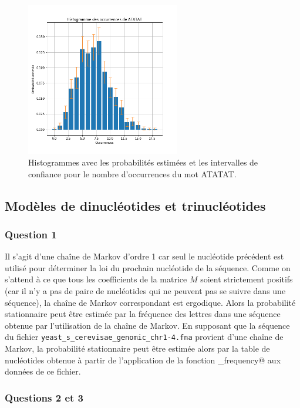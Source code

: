 \documentclass[a4paper,12pt]{article}
\begin{document}
\begin{figure}
\centering
\includegraphics[width=0.6\textwidth]{Figures/histogramme_ATATAT_errorbar.png}
\caption{Histogrammes avec les probabilités estimées et les intervalles de confiance pour le nombre d'occurrences du mot ATATAT.}
\label{FigHistogrammeErrorBar}
\end{figure}

\subsection{Modèles de dinucléotides et trinucléotides}

\subsubsection*{Question 1}

Il s'agit d'une chaîne de Markov d'ordre 1 car seul le nucléotide précédent est utilisé pour déterminer la loi du prochain nucléotide de la séquence. Comme on s'attend à ce que tous les coefficients de la matrice $M$ soient strictement positifs (car il n'y a pas de paire de nucléotides qui ne peuvent pas se suivre dans une séquence), la chaîne de Markov correspondant est ergodique. Alors la probabilité stationnaire peut être estimée par la fréquence des lettres dans une séquence obtenue par l'utilisation de la chaîne de Markov. En supposant que la séquence du fichier \texttt{yeast\_\allowbreak{}s\_\allowbreak{}cerevisae\_\allowbreak{}genomic\_\allowbreak{}chr1-4\allowbreak{}.fna} provient d'une chaîne de Markov, la probabilité stationnaire peut être estimée alors par la table de nucléotides obtenue à partir de l'application de la fonction \verb@nucleotide_frequency@ aux données de ce fichier.

\subsubsection*{Questions 2 et 3}
\end{document}
